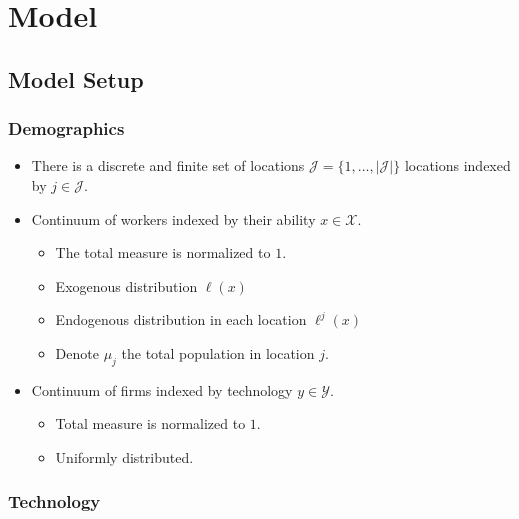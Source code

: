\documentclass[
  letterpaper,
  DIV=11,
  numbers=noendperiod]{scrreprt}
\providecommand{\tightlist}{%
  \setlength{\itemsep}{0pt}\setlength{\parskip}{0pt}}\usepackage{longtable,booktabs,array}
\begin{document}

\hypertarget{model}{%
\chapter{Model}\label{model}}

\hypertarget{model-setup}{%
\section{Model Setup}\label{model-setup}}

\hypertarget{demographics}{%
\subsection{Demographics}\label{demographics}}

\begin{itemize}
\tightlist
\item
  There is a discrete and finite set of locations
  \(\mathcal{J}=\{1,\dots,|\mathcal{J}|\}\) locations indexed by
  \(j\in\mathcal{J}\).
\item
  Continuum of workers indexed by their ability \(x\in \mathcal{X}\).

  \begin{itemize}
  \tightlist
  \item
    The total measure is normalized to \(1\).
  \item
    Exogenous distribution \(\ell(x)\)
  \item
    Endogenous distribution in each location \(\ell^{j}(x)\)
  \item
    Denote \(\mu_j\) the total population in location \(j\).
  \end{itemize}
\item
  Continuum of firms indexed by technology \(y\in \mathcal{Y}\).

  \begin{itemize}
  \tightlist
  \item
    Total measure is normalized to \(1\).
  \item
    Uniformly distributed.
  \end{itemize}
\end{itemize}

\hypertarget{technology}{%
\subsection{Technology}\label{technology}}
\end{document}
